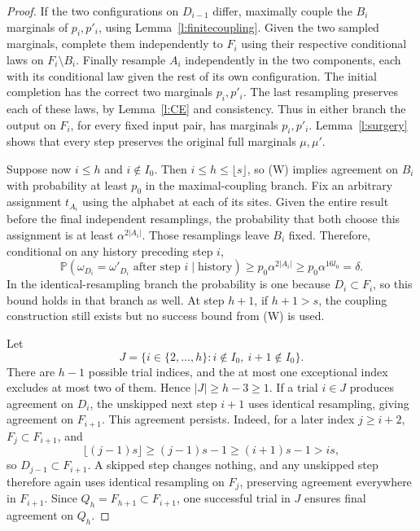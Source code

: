 \begin{proof}
If the two configurations on \(D_{i-1}\) differ, maximally couple
the \(B_i\) marginals of \(p_i,p'_i\), using
Lemma~\ref{l:finitecoupling}.  Given the two sampled marginals,
complete them independently to \(F_i\) using their respective
conditional laws on \(F_i\setminus B_i\).  Finally resample \(A_i\)
independently in the two components, each with its conditional law
given the rest of its own configuration.  The initial completion has
the correct two marginals \(p_i,p'_i\).  The last resampling preserves
each of these laws, by Lemma~\ref{l:CE} and consistency.  Thus in
either branch the output on \(F_i\), for every fixed input pair,
has marginals \(p_i,p'_i\).  Lemma~\ref{l:surgery} shows that every
step preserves the original full marginals \(\mu,\mu'\).

Suppose now \(i\le h\) and \(i\notin I_0\).
Then \(i\le h\le\lfloor s\rfloor\), so (W) implies agreement
on \(B_i\) with probability at least \(p_0\) in the maximal-coupling
branch.  Fix an arbitrary assignment \(t_{A_i}\) using the alphabet
at each of its sites.  Given the entire result before the final
independent resamplings, the probability that both choose this
assignment is at least \(\alpha^{2|A_i|}\).
Those resamplings leave \(B_i\) fixed.  Therefore, conditional on
any history preceding step \(i\),
\[
 \mathbb P(\omega_{D_i}=\omega'_{D_i}
                     \text{ after step }i\mid\text{history})
       \ge p_0\alpha^{2|A_i|}
       \ge p_0\alpha^{16l_0}=\delta.
\]
In the identical-resampling branch the probability is one because
\(D_i\subset F_i\), so this bound holds in that branch as well.
At step \(h+1\), if \(h+1>s\), the coupling construction still
exists but no success bound from (W) is used.

Let
\[
 J=\{i\in\{2,\ldots,h\}:i\notin I_0,
                                      \ i+1\notin I_0\}.
\]
There are \(h-1\) possible trial indices, and the at most one
exceptional index excludes at most two of them.  Hence
\(|J|\ge h-3\ge1\).
If a trial \(i\in J\) produces agreement on \(D_i\), the
unskipped next step \(i+1\) uses identical resampling, giving agreement
on \(F_{i+1}\).  This agreement persists.  Indeed, for a later index
\(j\ge i+2\), \(F_j\subset F_{i+1}\), and
\[
 \lfloor(j-1)s\rfloor\ge(j-1)s-1
                      \ge(i+1)s-1>is,
\]
so \(D_{j-1}\subset F_{i+1}\).
A skipped step changes nothing, and any unskipped step therefore
again uses identical resampling on \(F_j\), preserving agreement
everywhere in \(F_{i+1}\).  Since
\(Q_h=F_{h+1}\subset F_{i+1}\), one successful trial in \(J\)
ensures final agreement on \(Q_h\).


\end{proof}
